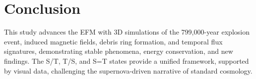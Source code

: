 \documentclass[11pt]{article}
\begin{document}
\section{Conclusion}
This study advances the EFM with 3D simulations of the 799,000-year explosion event, induced magnetic fields, debris ring formation, and temporal flux signatures, demonstrating stable phenomena, energy conservation, and new findings. The S/T, T/S, and S=T states provide a unified framework, supported by visual data, challenging the supernova-driven narrative of standard cosmology.
\end{document}
